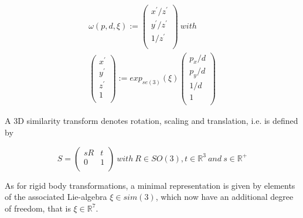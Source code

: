 \begin{equation}
\begin{split}
\omega(p,d,\xi):= \left(
                     \begin{array}{c}
                       x^{'}/z^{'} \\
                       y^{'}/z^{'} \\
                       1/z^{'} \\
                     \end{array}
                   \right) \ with \\
                   \left(
                     \begin{array}{c}
                       x^{'} \\
                       y^{'} \\
                       z^{'} \\
                       1 \\
                     \end{array}
                   \right):=\!exp_{\!se(\!3\!)}(\xi)
                   \left(
                     \begin{array}{c}
                       p_{x}/d \\
                       p_{y}/d  \\
                       1/d  \\
                       1 \\
                     \end{array}
                   \right)
\end{split}
\end{equation}

A 3D similarity transform   denotes rotation, scaling and translation, i.e. is defined by

\begin{equation}
S=\left(
    \begin{array}{cc}
      sR & t \\
      0 & 1 \\
    \end{array}
  \right)
  \ with
  \ R\in SO(3),t\in {\mathbb{R}}^{3}
  \ and \ s\in {\mathbb{R}}^{+}
\end{equation}

As for rigid body transformations, a minimal representation is given by elements of the associated Lie-algebra $\xi  \in sim(3)$, which now have an additional degree of freedom, that is $\xi\in {\mathbb{R}}^{7}$.

\fi



